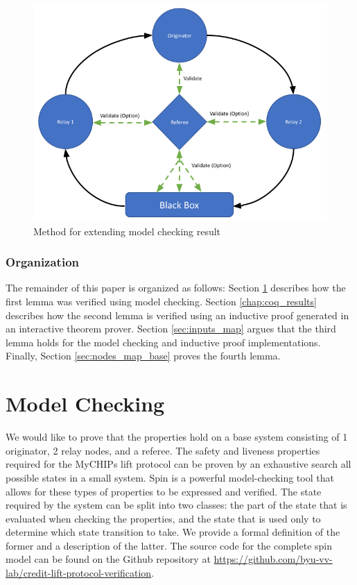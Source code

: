 \documentclass[runningheads]{llncs}
\newcommand{\coderepository}{Github repository at \url{https://github.com/byu-vv-lab/credit-lift-protocol-verification}}
\newif\ifcomments
\newcommand{\egm}[1]{\ifcomments\textcolor{orange}{egm: #1}\fi}
\newcommand{\krs}[1]{\ifcomments\textcolor{blue}{krs: #1}\fi}
\begin{document}
\egm{Shouldn't it be subseteq and superseteq? Strict subset/superset is stronger than what is needed. Right? Also, there needs to be a better transition to the next paragraph. It's not clear how it connects to the current paragraph.}
\krs{Yep you are right. But all that got moved into later sections now}

\begin{figure}[h]
    \centering
    \includegraphics[scale=0.35]{paper/CoqExtensionMethod.png}
    \caption{Method for extending model checking result}
    \label{fig:coqExtension}
\end{figure}

\subsubsection{Organization}
The remainder of this paper is organized as follows: Section \ref{chap:model_checking_results} describes how the first lemma was verified using model checking. Section \ref{chap:coq_results} describes how the second lemma is verified using an inductive proof generated in an interactive theorem prover. Section \ref{sec:inputs_map} argues that the third lemma holds for the model checking and inductive proof implementations. Finally, Section \ref{sec:nodes_map_base} proves the fourth lemma.

\section{Model Checking} \label{chap:model_checking_results}
We would like to prove that the properties hold on a base system consisting of 1 originator, 2 relay nodes, and a referee. The safety and liveness properties required for the MyCHIPs lift protocol can be proven by an exhaustive search all possible states in a small system. Spin is a powerful model-checking tool that allows for these types of properties to be expressed and verified. The state required by the system can be split into two classes: the part of the state that is evaluated when checking the properties, and the state that is used only to determine which state transition to take. We provide a formal definition of the former and a description of the latter. The source code for the complete spin model can be found on the \coderepository.
\end{document}
